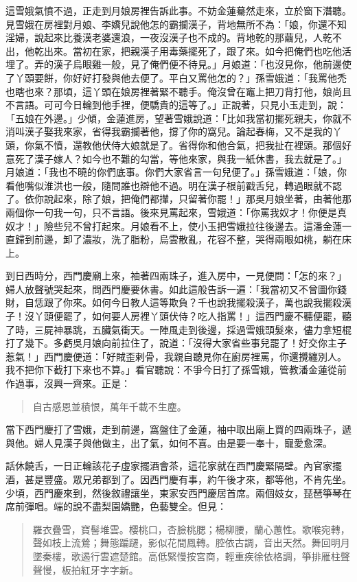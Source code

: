 這雪娥氣憤不過，正走到月娘房裡告訴此事。不妨金蓮驀然走來，立於窗下潛聽。見雪娥在房裡對月娘、李嬌兒說他怎的霸攔漢子，背地無所不為：「娘，你還不知淫婦，說起來比養漢老婆還浪，一夜沒漢子也不成的。背地乾的那繭兒，人乾不出，他乾出來。當初在家，把親漢子用毒藥擺死了，跟了來。如今把俺們也吃他活埋了。弄的漢子烏眼雞一般，見了俺們便不待見。」月娘道：「也沒見你，他前邊使了丫頭要餅，你好好打發與他去便了。平白又罵他怎的？」孫雪娥道：「我罵他禿也瞎也來？那頃，這丫頭在娘房裡著緊不聽手。俺沒曾在竈上把刀背打他，娘尚且不言語。可可今日輪到他手裡，便驕貴的這等了。」正說著，只見小玉走到，說：「五娘在外邊。」少傾，金蓮進房，望著雪娥說道：「比如我當初擺死親夫，你就不消叫漢子娶我來家，省得我霸攔著他，撐了你的窩兒。論起春梅，又不是我的丫頭，你氣不憤，還教他伏侍大娘就是了。省得你和他合氣，把我扯在裡頭。那個好意死了漢子嫁人？如今也不難的勾當，等他來家，與我一紙休書，我去就是了。」月娘道：「我也不曉的你們底事。你們大家省言一句兒便了。」孫雪娥道：「娘，你看他嘴似淮洪也一般，隨問誰也辯他不過。明在漢子根前戳舌兒，轉過眼就不認了。依你說起來，除了娘，把俺們都攆，只留著你罷！」那吳月娘坐著，由著他那兩個你一句我一句，只不言語。後來見罵起來，雪娥道：「你罵我奴才！你便是真奴才！」險些兒不曾打起來。月娘看不上，使小玉把雪娥拉往後邊去。這潘金蓮一直歸到前邊，卸了濃妝，洗了脂粉，烏雲散亂，花容不整，哭得兩眼如桃，躺在床上。

到日西時分，西門慶廟上來，袖著四兩珠子，進入房中，一見便問：「怎的來？」婦人放聲號哭起來，問西門慶要休書。如此這般告訴一遍：「我當初又不曾圖你錢財，自恁跟了你來。如何今日教人這等欺負？千也說我擺殺漢子，萬也說我擺殺漢子！沒丫頭便罷了，如何要人房裡丫頭伏侍？吃人指罵！」這西門慶不聽便罷，聽了時，三屍神暴跳，五臟氣衝天。一陣風走到後邊，採過雪娥頭髮來，儘力拿短棍打了幾下。多虧吳月娘向前拉住了，說道：「沒得大家省些事兒罷了！好交你主子惹氣！」西門慶便道：「好賊歪剌骨，我親自聽見你在廚房裡罵，你還攪纏別人。我不把你下截打下來也不算。」看官聽說：不爭今日打了孫雪娥，管教潘金蓮從前作過事，沒興一齊來。正是：
\begin{quote}
自古感恩並積恨，萬年千載不生塵。
\end{quote}

當下西門慶打了雪娥，走到前邊，窩盤住了金蓮，袖中取出廟上買的四兩珠子，遞與他。婦人見漢子與他做主，出了氣，如何不喜。由是要一奉十，寵愛愈深。

話休饒舌，一日正輪該花子虛家擺酒會茶，這花家就在西門慶緊隔壁。內官家擺酒，甚是豐盛。眾兄弟都到了。因西門慶有事，約午後才來，都等他，不肯先坐。少頃，西門慶來到，然後敘禮讓坐，東家安西門慶居首席。兩個妓女，琵琶箏琴在席前彈唱。端的說不盡梨園嬌艷，色藝雙全。但見：
\begin{quote}
羅衣疊雪，寶髻堆雲。櫻桃口，杏臉桃腮；楊柳腰，蘭心蕙性。歌喉宛轉，聲如枝上流鶯；舞態蹁躚，影似花間鳳轉。腔依古調，音出天然。舞回明月墜秦樓，歌遏行雲遮楚館。高低緊慢按宮商，輕重疾徐依格調，箏排雁柱聲聲慢，板拍紅牙字字新。
\end{quote}

